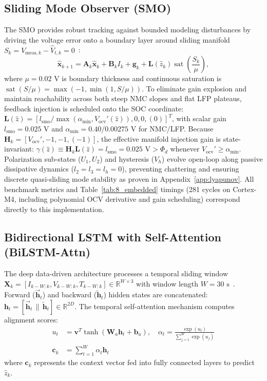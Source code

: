\documentclass[preprint,12pt]{elsarticle}
\begin{document}
\subsection{Sliding Mode Observer (SMO)}
The SMO provides robust tracking against bounded modeling disturbances by driving the voltage error onto a boundary layer around sliding manifold $S_k = V_{\text{meas},k} - \hat{V}_{t,k} = 0$~\cite{Kim2011,Chen2016smo}:
\begin{equation}\label{eqn:smo_state_eq}
\hat{\mathbf{x}}_{k+1} = \mathbf{A}_k \hat{\mathbf{x}}_k + \mathbf{B}_k I_k + \mathbf{g}_k + \mathbf{L}(\hat{z}_k) \operatorname{sat}\left( \frac{S_k}{\mu} \right),
\end{equation}
where $\mu = 0.02\text{ V}$ is boundary thickness and continuous saturation is $\operatorname{sat}(S/\mu) = \max(-1, \min(1, S/\mu))$. To eliminate gain explosion and maintain reachability across both steep NMC slopes and flat LFP plateaus, feedback injection is scheduled onto the SOC coordinate: $\mathbf{L}(\hat{z}) = [l_{\text{smo}}/\max(\alpha_{\min}, V_{\text{ocv}}'(\hat{z})), 0, 0, (0)]^T$, with scalar gain $l_{\text{smo}} = 0.025\text{ V}$ and $\alpha_{\min} = 0.40/0.00275\text{ V}$ for NMC/LFP. Because $\mathbf{H}_k = [V_{\text{ocv}}', -1, -1, (-1)]$, the effective manifold injection gain is state-invariant: $\gamma(\hat{z}) \equiv \mathbf{H}_k\mathbf{L}(\hat{z}) = l_{\text{smo}} = 0.025\text{ V} > \Phi_d$ whenever $V_{\text{ocv}}' \ge \alpha_{\min}$. Polarization sub-states ($U_1, U_2$) and hysteresis ($V_h$) evolve open-loop along passive dissipative dynamics ($l_2 = l_3 = l_h = 0$), preventing chattering and ensuring discrete quasi-sliding mode stability as proven in Appendix~\ref{app:lyapunov}. All benchmark metrics and Table~\ref{tab:8_embedded} timings (281 cycles on Cortex-M4, including polynomial OCV derivative and gain scheduling) correspond directly to this implementation.

\subsection{Bidirectional LSTM with Self-Attention (BiLSTM-Attn)}
The deep data-driven architecture processes a temporal sliding window $\mathbf{X}_k = [I_{k-W:k}, V_{k-W:k}, T_{k-W:k}] \in \mathbb{R}^{W \times 3}$ with window length $W = 30\text{ s}$~\cite{Song2019bilstm,Vaswani2017attention}. Forward ($\overrightarrow{\mathbf{h}}_t$) and backward ($\overleftarrow{\mathbf{h}}_t$) hidden states are concatenated: $\mathbf{h}_t = [\overrightarrow{\mathbf{h}}_t \,\|\, \overleftarrow{\mathbf{h}}_t] \in \mathbb{R}^{2 D}$. The temporal self-attention mechanism computes alignment scores:
\begin{align}
u_t &= \mathbf{v}^T \tanh(\mathbf{W}_a \mathbf{h}_t + \mathbf{b}_a), \quad \alpha_t = \frac{\exp(u_t)}{\sum_{j=1}^W \exp(u_j)} \label{eqn:attn_weight}\\
\mathbf{c}_k &= \sum_{t=1}^W \alpha_t \mathbf{h}_t \label{eqn:attn_context}
\end{align}
where $\mathbf{c}_k$ represents the context vector fed into fully connected layers to predict $\hat{z}_k$.
\end{document}
